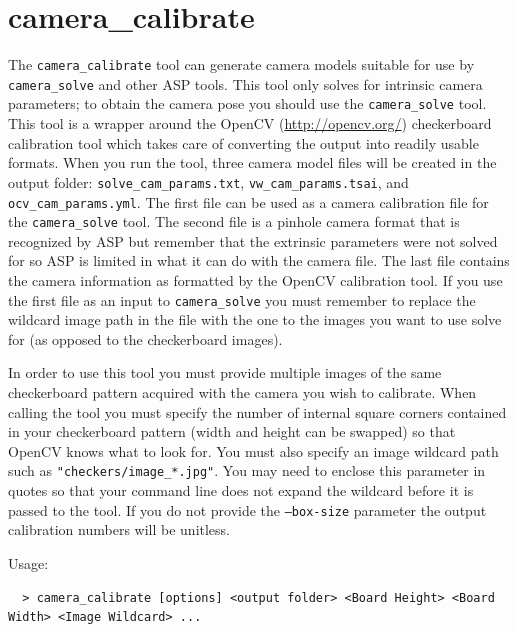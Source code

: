 \section{camera\_calibrate}
\label{cameracalibrate}

The \texttt{camera\_calibrate} tool can generate camera models suitable for use by \texttt{camera\_solve}
and other ASP tools.  This tool only solves for intrinsic camera parameters; to obtain the camera pose you
should  use the \texttt{camera\_solve} tool.  This tool is a wrapper around the OpenCV (\url{http://opencv.org/})
checkerboard calibration tool which takes care of converting the output into readily usable formats.  When you
run the tool, three camera model files will be created in the output folder:
\texttt{solve\_cam\_params.txt}, \texttt{vw\_cam\_params.tsai}, and \texttt{ocv\_cam\_params.yml}.
The first file can be used as a camera calibration file for the \texttt{camera\_solve} tool.  The second file
is a pinhole camera format that is recognized by ASP but remember that the extrinsic parameters were not solved
for so ASP is limited in what it can do with the camera file.  The last file contains the camera information as
formatted by the OpenCV calibration tool.  If you use the first file as an input to \texttt{camera\_solve}
you must remember to replace the wildcard image path in the file with the one to the images you want to use
solve for (as opposed to the checkerboard images).

In order to use this tool you must provide multiple images of the same checkerboard pattern acquired with
the camera you wish to calibrate.  When calling the tool you must specify the number of internal square corners
contained in your checkerboard pattern (width and height can be swapped) so that OpenCV knows what to look for.
You must also specify an image wildcard path such as \texttt{"checkers/image\_*.jpg"}.  You may need to enclose this
parameter in quotes so that your command line does not expand the wildcard before it is passed to the tool.
If you do not provide the \texttt{--box-size} parameter the output calibration numbers will be unitless.

Usage:
\begin{verbatim}
  > camera_calibrate [options] <output folder> <Board Height> <Board Width> <Image Wildcard> ...
\end{verbatim}


